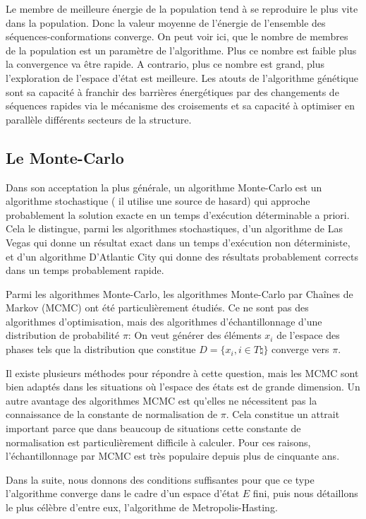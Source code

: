 Le membre de meilleure énergie de la population tend à se reproduire le plus vite dans la population. 
Donc la valeur moyenne de l'énergie de l'ensemble des séquences-conformations converge.
On peut voir ici, que le nombre de membres de la population est un paramètre de l'algorithme. Plus ce nombre est faible plus la convergence va être rapide. A contrario, plus ce nombre est grand, plus l'exploration de l'espace d'état est meilleure.
Les atouts de l'algorithme génétique sont sa capacité à franchir des barrières énergétiques par des changements de séquences rapides via le mécanisme des croisements et sa capacité à optimiser en parallèle différents secteurs de la structure.

\subsection{Le Monte-Carlo}
\label{sub:MC}
Dans son acceptation la plus générale, un algorithme Monte-Carlo est un algorithme stochastique ( il utilise une source de hasard) qui approche probablement la solution exacte en un temps d'exécution déterminable a priori. Cela le distingue, parmi les algorithmes stochastiques, d'un algorithme de Las Vegas qui donne un résultat exact dans un temps d'exécution non déterministe, et d'un algorithme D'Atlantic City qui donne des résultats probablement corrects dans un temps probablement rapide.

Parmi les algorithmes Monte-Carlo, les algorithmes Monte-Carlo par Chaînes de Markov (MCMC) ont été particulièrement étudiés.
Ce ne sont pas des algorithmes d'optimisation, mais des algorithmes d'échantillonnage d'une distribution de probabilité $\pi$: On veut générer des éléments $x_i$ de l'espace des phases tels que la distribution que constitue $D=\{x_i, i \in T \natural \}$ converge vers $\pi$.

Il existe plusieurs méthodes pour répondre à cette question, mais les MCMC sont bien adaptés dans les situations où l'espace des états est de grande dimension. Un autre avantage des algorithmes MCMC est qu'elles ne nécessitent pas la connaissance de la constante de normalisation de $\pi$. Cela constitue un attrait important parce que dans beaucoup de situations cette constante de normalisation est particulièrement difficile à calculer. Pour ces raisons, l'échantillonnage par MCMC est très populaire depuis plus de cinquante ans.

Dans la suite, nous donnons des conditions suffisantes pour que ce type l'algorithme converge dans le cadre d'un espace d'état $E$ fini, puis nous détaillons le plus célèbre d'entre eux, l'algorithme de Metropolis-Hasting.

